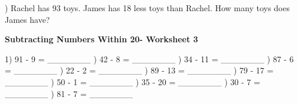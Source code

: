 \documentclass{article}%
\begin{document}
) Rachel has 93 toys. James has 18 less toys than Rachel. How many toys does James have?%
\newline%
\newline%
\newline%
\pagebreak%
\large%
\begin{center}%
\textbf{Subtracting Numbers Within 20- Worksheet 3}%
\newline%
\newline%
\newline%
\end{center} \normalsize%
1) 91 {-} 9 = \_\_\_\_\_\_\_%
\newline%
\newline%
) 42 {-} 8 = \_\_\_\_\_\_\_%
\newline%
\newline%
) 34 {-} 11 = \_\_\_\_\_\_\_%
\newline%
\newline%
) 87 {-} 6 = \_\_\_\_\_\_\_%
\newline%
\newline%
) 22 {-} 2 = \_\_\_\_\_\_\_%
\newline%
\newline%
) 89 {-} 13 = \_\_\_\_\_\_\_%
\newline%
\newline%
) 79 {-} 17 = \_\_\_\_\_\_\_%
\newline%
\newline%
) 50 {-} 1 = \_\_\_\_\_\_\_%
\newline%
\newline%
) 35 {-} 20 = \_\_\_\_\_\_\_%
\newline%
\newline%
) 30 {-} 7 = \_\_\_\_\_\_\_%
\newline%
\newline%
) 81 {-} 7 = \_\_\_\_\_\_\_%
\newline%
\newline%
\newline%
\end{document}
